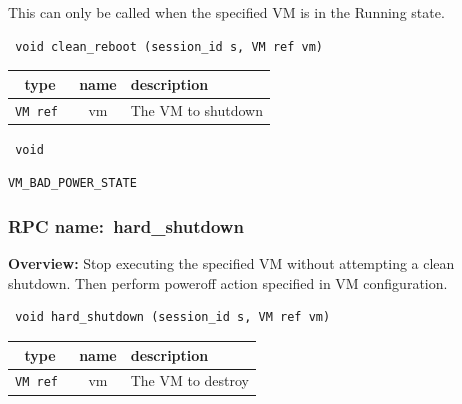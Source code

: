 This can only be called when the specified VM is in the Running state.

\begin{verbatim} void clean_reboot (session_id s, VM ref vm)\end{verbatim}



 
\vspace{0.3cm}
\begin{tabular}{|c|c|p{7cm}|}
 \hline
{\bf type} & {\bf name} & {\bf description} \\ \hline
{\tt VM ref } & vm & The VM to shutdown \\ \hline 

\end{tabular}

\vspace{0.3cm}

{\tt 
void
}



\vspace{0.3cm}

 {\tt VM\_BAD\_POWER\_STATE}

\vspace{0.6cm}
\subsubsection{RPC name:~hard\_shutdown}

{\bf Overview:} 
Stop executing the specified VM without attempting a clean shutdown. Then perform poweroff action specified in VM configuration.

\begin{verbatim} void hard_shutdown (session_id s, VM ref vm)\end{verbatim}



 
\vspace{0.3cm}
\begin{tabular}{|c|c|p{7cm}|}
 \hline
{\bf type} & {\bf name} & {\bf description} \\ \hline
{\tt VM ref } & vm & The VM to destroy \\ \hline 

\end{tabular}

\vspace{0.3cm}

